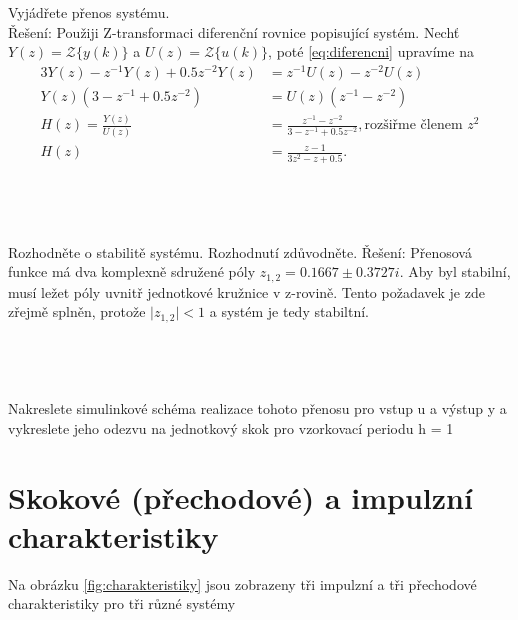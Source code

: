 \documentclass[twoside]{article}
\begin{document}
\subsection{~}
Vyjádřete přenos systému. \\
Řešení: Použiji Z-transformaci diferenční rovnice popisující systém. Nechť $Y(z) = \mathcal{Z}\{y(k)\}$ a $U(z) = \mathcal{Z}\{u(k)\}$, poté \eqref{eq:diferencni} upravíme na
\begin{equation}
	\begin{split}
		3Y(z) - z^{-1} Y(z) + 0.5 z^{-2} Y(z) &= z^{-1}U(z) - z^{-2}U(z) \\
		Y(z) (3- z^{-1} + 0.5 z^{-2}) &= U(z) (z^{-1} - z^{-2}) \\
		H(z) = \frac{Y(z)}{U(z)} &= \frac{z^{-1} - z^{-2}}{3-z^{-1}+ 0.5z^{-2}}, \text{rozšiřme členem $z^2$} \\
		H(z) &= \frac{z - 1}{3z^2-z+ 0.5}.
	\end{split}
\end{equation}

\subsection{~}
Rozhodněte o stabilitě systému. Rozhodnutí zdůvodněte.
Řešení: Přenosová funkce má dva komplexně sdružené póly $ z_{1,2} = 0.1667 \pm 0.3727i$. Aby byl stabilní, musí ležet póly uvnitř jednotkové kružnice v z-rovině.
Tento požadavek je zde zřejmě splněn, protože $\vert z_{1,2} \vert < 1 $ a systém je tedy stabiltní.
\subsection{~}
Nakreslete simulinkové schéma realizace tohoto přenosu pro vstup u a výstup y a vykreslete jeho odezvu
na jednotkový skok pro vzorkovací periodu h = 1


\section{ Skokové (přechodové) a impulzní charakteristiky}
\label{sec:ukol11}
Na obrázku \ref{fig:charakteristiky} jsou zobrazeny tři impulzní a tři přechodové charakteristiky pro tři různé systémy
\end{document}
